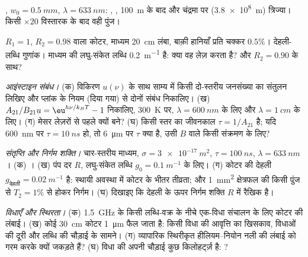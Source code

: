 \begin{exercise}[$\star$]\label{exo:b2:laser:3}
, $w_0 = \qty{0.5}{mm}$, $\lambda = \qty{633}{nm}$: , , \qty{100}{m} के बाद और चंद्रमा पर
(\qty{3.8e8}{m}) त्रिज्या। किसी $\times 20$ विस्तारक के बाद वही पुंज।
\end{exercise}

\begin{exercise}[$\star$]\label{exo:b2:laser:4}
$R_1 = 1$, $R_2 = 0.98$ वाला कोटर, माध्यम \qty{20}{cm} लंबा, बाक़ी
हानियाँ प्रति चक्कर $0.5\%$। देहली-लब्धि गुणांक। माध्यम की
लघु-संकेत लब्धि \qty{0.2}{m^{-1}} है: क्या वह लेज़ करता है? और
$R_2 = 0.90$ के साथ?
\end{exercise}

\begin{exercise}[$\star\star$]\label{exo:b2:laser:5}
\emph{आइंस्टाइन संबंध।} (क) विकिरण $u(\nu)$ के साथ साम्य में किसी दो-स्तरीय
जनसंख्या का संतुलन लिखिए और प्लांक के नियम (दिया गया) से दोनों
संबंध निकालिए। (ख) $A_{21}/B_{21}u = \eu^{h\nu/k_BT} - 1$ निकालिए,
\qty{300}{K} पर, $\lambda = \qty{600}{nm}$ के लिए और $\lambda = \qty{1}{cm}$ के
लिए। (ग) मेसर
लेज़रों से पहले क्यों बने? (घ) किसी स्तर का जीवनकाल
$\tau = 1/A_{21}$ है; यदि \qty{600}{nm} पर $\tau = \qty{10}{ns}$ हो, तो \qty{6}{\micro m}
पर $\tau$ क्या है, उसी $B$ वाले किसी संक्रमण के लिए?
\end{exercise}

\begin{exercise}[$\star\star$]\label{exo:b2:laser:6}
\emph{संतृप्ति और निर्गम शक्ति।} चार-स्तरीय माध्यम, $\sigma =
\qty{3e-17}{m^2}$, $\tau = \qty{100}{ns}$, $\lambda = \qty{633}{nm}$।
(क) । (ख) पंप दर $R$, लघु-संकेत लब्धि
$g_0 = \qty{0.1}{m^{-1}}$ के लिए। (ग) कोटर की देहली
$g_{\text{देहली}} = \qty{0.02}{m^{-1}}$ है: स्थायी अवस्था में कोटर के भीतर
तीव्रता; और \qty{1}{mm^2} क्षेत्रफल की किसी पुंज से $T_2 = 1\%$ से होकर निर्गम।
(घ) दिखाइए कि देहली के ऊपर निर्गम शक्ति $R$ में रैखिक है।
\end{exercise}

\begin{exercise}[$\star\star$]\label{exo:b2:laser:7}
\emph{विधाएँ और स्थिरता।} (क) \qty{1.5}{GHz} के किसी लब्धि-वक्र के नीचे
एक-विधा संचालन के लिए कोटर की लंबाई। (ख) कोई \qty{30}{cm} कोटर
\qty{1}{\micro m} फैल जाता है: किसी विधा की आवृत्ति का खिसकाव,
विधाओं की दूरी और लब्धि की चौड़ाई के सामने। (ग) व्यापारिक स्थिरीकृत हीलियम--नियोन
 नली की लंबाई को गरम करके क्यों जकड़ते हैं? (घ) विधा की अपनी चौड़ाई
कुछ किलोहर्ट्ज़ है: ?
\end{exercise}

